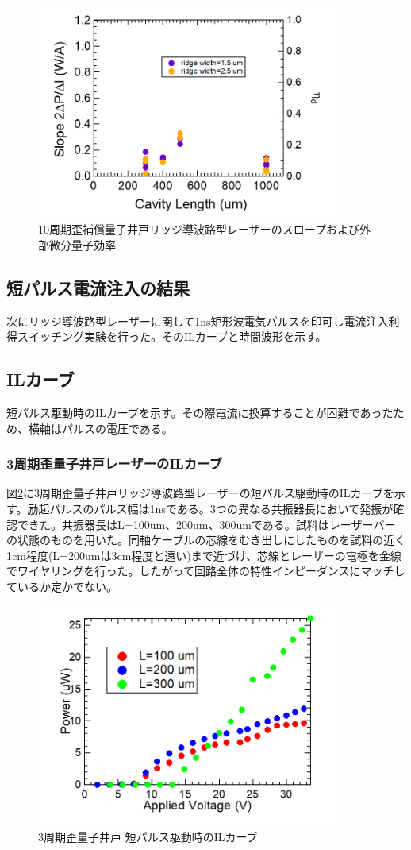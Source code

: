 {\begin{figure}[h]
	\centering
	\includegraphics[width=10cm]{figure/fig_3_2_10QW_ridge_slope.png}
		\caption{10周期歪補償量子井戸リッジ導波路型レーザーのスロープおよび外部微分量子効率}
		\label{fig:fig_3_2_10QW_ridge_slope}
\end{figure}
\clearpage
\subsection{短パルス電流注入の結果}

次にリッジ導波路型レーザーに関して1ns矩形波電気パルスを印可し電流注入利得スイッチング実験を行った。そのILカーブと時間波形を示す。
\subsection{ILカーブ}
短パルス駆動時のILカーブを示す。その際電流に換算することが困難であったため、横軸はパルスの電圧である。
\subsubsection{3周期歪量子井戸レーザーのILカーブ}
図\ref{fig:fig_3_2_3QW_ridge_GS_power}に3周期歪量子井戸リッジ導波路型レーザーの短パルス駆動時のILカーブを示す。励起パルスのパルス幅は1nsである。3つの異なる共振器長において発振が確認できた。共振器長はL=100um、200um、300umである。試料はレーザーバーの状態のものを用いた。同軸ケーブルの芯線をむき出しにしたものを試料の近く1cm程度(L=200umは3cm程度と遠い)まで近づけ、芯線とレーザーの電極を金線でワイヤリングを行った。したがって回路全体の特性インピーダンスにマッチしているか定かでない。

\begin{figure}[h]
	\centering
	\includegraphics[width=10cm]{figure/fig_3_2_3QW_ridge_GS_power.png}
		\caption{3周期歪量子井戸 短パルス駆動時のILカーブ}
		\label{fig:fig_3_2_3QW_ridge_GS_power}
\end{figure}


}
